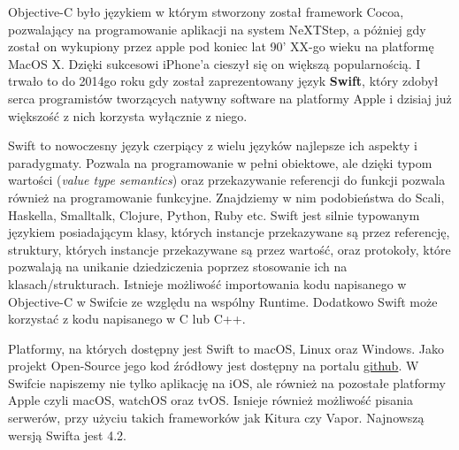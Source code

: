 \documentclass{article}
\begin{document}
Objective-C było językiem w którym stworzony został framework Cocoa, pozwalający
na programowanie aplikacji na system NeXTStep, a póżniej gdy został on wykupiony 
przez apple pod koniec lat 90' XX-go wieku na platformę MacOS X. Dzięki sukcesowi
iPhone'a cieszył się on większą popularnością. I trwało to do 2014go roku gdy
został zaprezentowany język \textbf{Swift}, który zdobył serca programistów tworzących
natywny software na platformy Apple i dzisiaj już większość z nich korzysta wyłącznie
z niego.

Swift to nowoczesny język czerpiący z wielu języków najlepsze ich aspekty i 
paradygmaty. Pozwala na programowanie w pełni obiektowe, ale dzięki typom wartości
(\textit{value type semantics}) oraz przekazywanie referencji do funkcji pozwala 
również na programowanie funkcyjne. Znajdziemy w nim podobieństwa do Scali, Haskella,
Smalltalk, Clojure, Python, Ruby etc. Swift jest silnie typowanym językiem 
posiadającym klasy, których instancje przekazywane są przez referencję, struktury,
których instancje przekazywane są przez wartość, oraz protokoły, które pozwalają
na unikanie dziedziczenia poprzez stosowanie ich na klasach/strukturach. Istnieje
możliwość importowania kodu napisanego w Objective-C w Swifcie ze względu na wspólny
Runtime. Dodatkowo Swift może korzystać z kodu napisanego w C lub C++. 

Platformy, na których dostępny jest Swift to macOS, Linux oraz Windows. Jako 
projekt Open-Source jego kod źródłowy jest dostępny na portalu 
\href{https://github.com/apple/swift}{github}. W Swifcie napiszemy nie tylko
aplikację na iOS, ale również na pozostałe platformy Apple czyli macOS, watchOS
oraz tvOS\@. Isnieje również możliwość pisania serwerów, przy użyciu takich frameworków 
jak Kitura czy Vapor. Najnowszą wersją Swifta jest 4.2.
\end{document}
